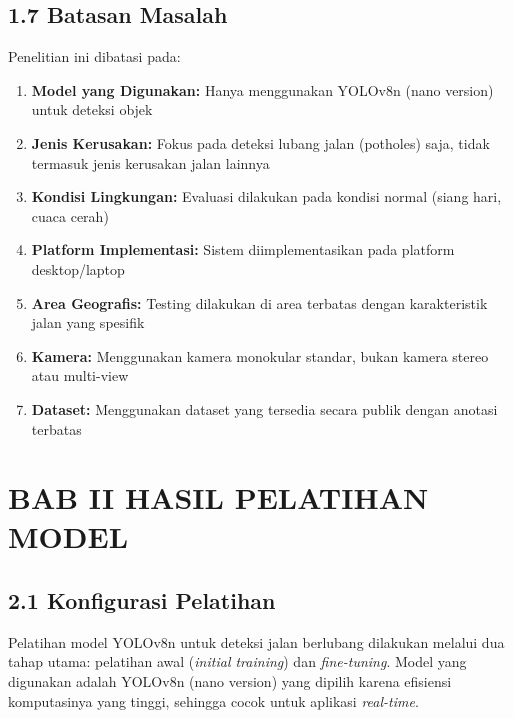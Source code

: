 \documentclass[12pt,a4paper]{article}
\begin{document}
\subsection*{1.7 Batasan Masalah}
Penelitian ini dibatasi pada:
\begin{enumerate}
    \item \textbf{Model yang Digunakan:} Hanya menggunakan YOLOv8n (nano version) untuk deteksi objek
    \item \textbf{Jenis Kerusakan:} Fokus pada deteksi lubang jalan (potholes) saja, tidak termasuk jenis kerusakan jalan lainnya
    \item \textbf{Kondisi Lingkungan:} Evaluasi dilakukan pada kondisi normal (siang hari, cuaca cerah)
    \item \textbf{Platform Implementasi:} Sistem diimplementasikan pada platform desktop/laptop
    \item \textbf{Area Geografis:} Testing dilakukan di area terbatas dengan karakteristik jalan yang spesifik
    \item \textbf{Kamera:} Menggunakan kamera monokular standar, bukan kamera stereo atau multi-view
    \item \textbf{Dataset:} Menggunakan dataset yang tersedia secara publik dengan anotasi terbatas
\end{enumerate}



\clearpage
\raggedright
{}

\onehalfspacing

\section*{BAB II HASIL PELATIHAN MODEL}

\subsection*{2.1 Konfigurasi Pelatihan}

Pelatihan model YOLOv8n untuk deteksi jalan berlubang dilakukan melalui dua tahap utama: pelatihan awal (\textit{initial training}) dan \textit{fine-tuning}. Model yang digunakan adalah YOLOv8n (nano version) yang dipilih karena efisiensi komputasinya yang tinggi, sehingga cocok untuk aplikasi \textit{real-time}.
\end{document}
